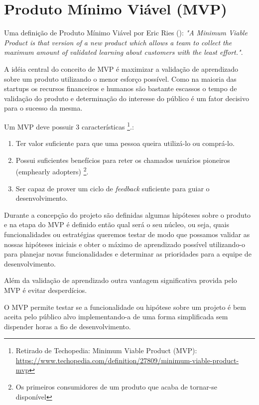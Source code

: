 \section{Produto Mínimo Viável (MVP)}

\par Uma definição de Produto Mínimo Viável por Eric Ries (\cite{ries:11}):
\emph{"A Minimum Viable Product is that version of a new product which allows a team to collect the maximum amount of validated learning about customers with the least effort."}.
    \par A idéia central do conceito de MVP é maximizar a validação de aprendizado sobre um produto utilizando o menor esforço possível. Como na maioria das startups os recursos financeiros e humanos são bastante escassos o tempo de validação do produto e determinação do interesse do público é um fator decisivo para o sucesso da mesma.
    \par Um MVP deve possuir 3 características \footnote{ Retirado de Techopedia: Minimum Viable Product (MVP): \url{https://www.techopedia.com/definition/27809/minimum-viable-product-mvp}}.:
    \begin{enumerate}
        \item Ter valor suficiente para que uma pessoa queira utilizá-lo ou comprá-lo.
        \item Possui suficientes benefícios para reter os chamados usuários pioneiros (emph{early adopters}) \footnote{Os primeiros consumidores de um produto que acaba de tornar-se disponível}.
        \item Ser capaz de prover um ciclo de \emph{feedback} suficiente para guiar o desenvolvimento.
\end{enumerate}
    \par Durante a concepção do projeto são definidas algumas hipóteses sobre o produto e na etapa do MVP é definido então qual será o seu núcleo, ou seja, quais funcionalidades ou estratégias queremos testar de modo que possamos validar  as nossas hipóteses iniciais e obter o máximo de aprendizado possível utilizando-o para planejar novas funcionalidades e determinar as prioridades para a equipe de desenvolvimento.
    \par Além da validação de aprendizado outra vantagem significativa provida pelo MVP é evitar desperdícios. 
    \par O MVP permite testar se a funcionalidade ou hipótese sobre um projeto é bem aceita pelo público alvo implementando-a de uma forma simplificada sem dispender horas a fio de desenvolvimento.
